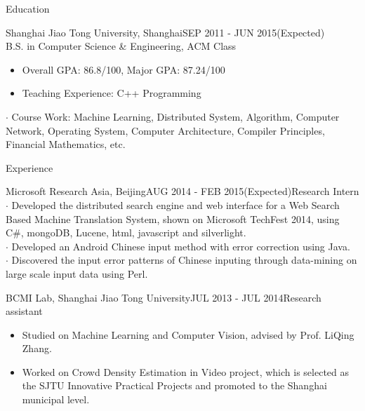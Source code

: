 \documentclass{resume} %
\begin{document}

\begin{rSection}{Education}

\begin{rSubsection}{Shanghai Jiao Tong University, Shanghai}{SEP 2011 - JUN 2015(Expected)}{}\\
B.S. in Computer Science \& Engineering, ACM Class 
\begin{itemize}
\item Overall GPA: 86.8/100, Major GPA: 87.24/100
\item Teaching Experience: C++ Programming
\end{itemize}
$\cdot$ Course Work: Machine Learning, Distributed System, Algorithm, Computer Network, Operating System, Computer Architecture, Compiler Principles, Financial Mathematics, etc.
\end{rSubsection}

\end{rSection}


\begin{rSection}{Experience}

\begin{rSubsection}{Microsoft Research Asia, Beijing}{AUG 2014 - FEB 2015(Expected)}{Research Intern}
\\ $\cdot$ Developed the distributed search engine and web interface for a Web Search Based Machine Translation System, shown on Microsoft TechFest 2014, using C\#, mongoDB, Lucene, html, javascript and silverlight.
\\ $\cdot$ Developed an Android Chinese input method with error correction using Java. 
\\ $\cdot$ Discovered the input error patterns of Chinese inputing through data-mining on large scale input data using Perl.
\end{rSubsection}

\begin{rSubsection}{BCMI Lab, Shanghai Jiao Tong University}{JUL 2013 - JUL 2014}{Research assistant}
\begin{itemize}
\item Studied on Machine Learning and Computer Vision, advised by Prof. LiQing Zhang.
\item Worked on Crowd Density Estimation in Video project, which is selected as the SJTU Innovative Practical Projects and promoted to the Shanghai municipal level.
\end{itemize}
\end{rSubsection}

\end{rSection}
\end{document}
